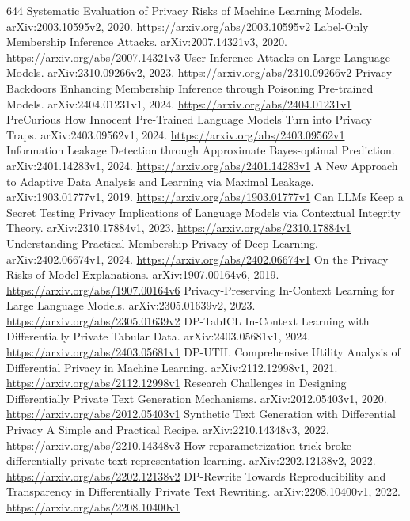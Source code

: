 \documentclass[11pt]{article}
\begin{document}
\begin{thebibliography}{644}
 Systematic Evaluation of Privacy Risks of Machine Learning Models. arXiv:2003.10595v2, 2020. \url{https://arxiv.org/abs/2003.10595v2}
 Label-Only Membership Inference Attacks. arXiv:2007.14321v3, 2020. \url{https://arxiv.org/abs/2007.14321v3}
 User Inference Attacks on Large Language Models. arXiv:2310.09266v2, 2023. \url{https://arxiv.org/abs/2310.09266v2}
 Privacy Backdoors Enhancing Membership Inference through Poisoning Pre-trained Models. arXiv:2404.01231v1, 2024. \url{https://arxiv.org/abs/2404.01231v1}
 PreCurious How Innocent Pre-Trained Language Models Turn into Privacy Traps. arXiv:2403.09562v1, 2024. \url{https://arxiv.org/abs/2403.09562v1}
 Information Leakage Detection through Approximate Bayes-optimal Prediction. arXiv:2401.14283v1, 2024. \url{https://arxiv.org/abs/2401.14283v1}
 A New Approach to Adaptive Data Analysis and Learning via Maximal Leakage. arXiv:1903.01777v1, 2019. \url{https://arxiv.org/abs/1903.01777v1}
 Can LLMs Keep a Secret Testing Privacy Implications of Language Models via Contextual Integrity Theory. arXiv:2310.17884v1, 2023. \url{https://arxiv.org/abs/2310.17884v1}
 Understanding Practical Membership Privacy of Deep Learning. arXiv:2402.06674v1, 2024. \url{https://arxiv.org/abs/2402.06674v1}
 On the Privacy Risks of Model Explanations. arXiv:1907.00164v6, 2019. \url{https://arxiv.org/abs/1907.00164v6}
 Privacy-Preserving In-Context Learning for Large Language Models. arXiv:2305.01639v2, 2023. \url{https://arxiv.org/abs/2305.01639v2}
 DP-TabICL In-Context Learning with Differentially Private Tabular Data. arXiv:2403.05681v1, 2024. \url{https://arxiv.org/abs/2403.05681v1}
 DP-UTIL Comprehensive Utility Analysis of Differential Privacy in Machine Learning. arXiv:2112.12998v1, 2021. \url{https://arxiv.org/abs/2112.12998v1}
 Research Challenges in Designing Differentially Private Text Generation Mechanisms. arXiv:2012.05403v1, 2020. \url{https://arxiv.org/abs/2012.05403v1}
 Synthetic Text Generation with Differential Privacy A Simple and Practical Recipe. arXiv:2210.14348v3, 2022. \url{https://arxiv.org/abs/2210.14348v3}
 How reparametrization trick broke differentially-private text representation learning. arXiv:2202.12138v2, 2022. \url{https://arxiv.org/abs/2202.12138v2}
 DP-Rewrite Towards Reproducibility and Transparency in Differentially Private Text Rewriting. arXiv:2208.10400v1, 2022. \url{https://arxiv.org/abs/2208.10400v1}

\end{thebibliography}
\end{document}
